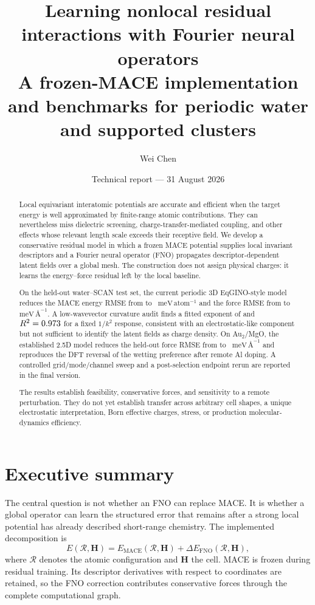 \documentclass[11pt]{article}
\title{\textbf{Learning nonlocal residual interactions with Fourier neural operators}\\
\large A frozen-MACE implementation and benchmarks for periodic water and supported clusters}
\author{Wei Chen}
\date{Technical report --- 31 August 2026}
\newcommand{\meva}{\ensuremath{\mathrm{meV\,\text{\AA}^{-1}}}}
\newcommand{\mevpa}{\ensuremath{\mathrm{meV\,atom^{-1}}}}
\begin{document}
\maketitle

\begin{abstract}
Local equivariant interatomic potentials are accurate and efficient when the
target energy is well approximated by finite-range atomic contributions. They
can nevertheless miss dielectric screening, charge-transfer-mediated
coupling, and other effects whose relevant length scale exceeds their
receptive field. We develop a conservative residual model in which a frozen
MACE potential supplies local invariant descriptors and a Fourier neural
operator (FNO) propagates descriptor-dependent latent fields over a global
mesh. The construction does not assign physical charges: it learns the
energy--force residual left by the local baseline.

On the held-out water--SCAN test set, the current periodic 3D EqGINO-style
model reduces the MACE energy RMSE from \WaterMaceEnergy{} to
\WaterFnoEnergy{}~\mevpa{} and the force RMSE from \WaterMaceForce{} to
\WaterFnoForce{}~\meva{}. A low-wavevector curvature audit finds a fitted
exponent of \WaterSpectralExponent{} and \(R^2=0.973{}\) for a
fixed \(1/k^2\) response, consistent with an electrostatic-like component but
not sufficient to identify the latent fields as charge density. On
Au$_2$/MgO, the established 2.5D model reduces the held-out force RMSE from
\AuMaceForce{} to \AuFnoForce{}~\meva{} and reproduces the DFT reversal of the
wetting preference after remote Al doping. A controlled grid/mode/channel
sweep and a post-selection endpoint rerun are reported in the final version.

The results establish feasibility, conservative forces, and sensitivity to a
remote perturbation. They do not yet establish transfer across arbitrary cell
shapes, a unique electrostatic interpretation, Born effective charges, stress,
or production molecular-dynamics efficiency.
\end{abstract}

\section{Executive summary}

The central question is not whether an FNO can replace MACE. It is whether a
global operator can learn the structured error that remains after a strong
local potential has already described short-range chemistry. The implemented
decomposition is
\begin{equation}
 E(\mathcal R,\mathbf H)=E_{\mathrm{MACE}}(\mathcal R,\mathbf H)
 +\Delta E_{\mathrm{FNO}}(\mathcal R,\mathbf H),
 \label{eq:decomposition}
\end{equation}
where \(\mathcal R\) denotes the atomic configuration and \(\mathbf H\) the
cell. MACE is frozen during residual training. Its descriptor derivatives
with respect to coordinates are retained, so the FNO correction contributes
conservative forces through the complete computational graph.
\end{document}
